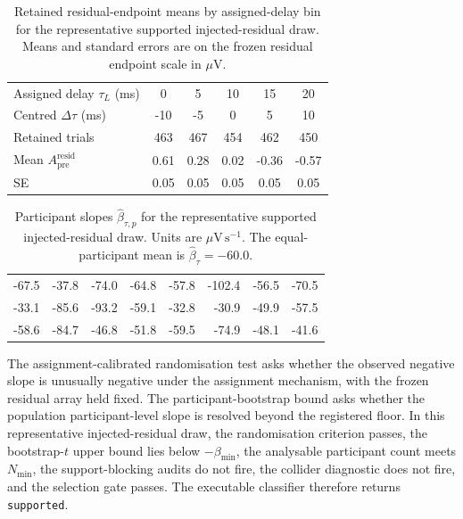 \begin{table}[t]
\centering
\caption{Retained residual-endpoint means by assigned-delay bin for the representative supported injected-residual draw. Means and standard errors are on the frozen residual endpoint scale in \(\mu\mathrm{V}\).}
\label{tab:si-worked-bins}
\footnotesize
\setlength{\tabcolsep}{4pt}
\begin{tabular}{lccccc}
\toprule
Assigned delay \(\tau_L\) (ms) & 0 & 5 & 10 & 15 & 20 \\
Centred \(\Delta\tau\) (ms) & -10 & -5 & 0 & 5 & 10 \\
\midrule
Retained trials & 463 & 467 & 454 & 462 & 450 \\
Mean \(A^{\mathrm{resid}}_{\mathrm{pre}}\) & 0.61 & 0.28 & 0.02 & -0.36 & -0.57 \\
SE & 0.05 & 0.05 & 0.05 & 0.05 & 0.05 \\
\bottomrule
\end{tabular}
\end{table}

\begin{table}[t]
\centering
\caption{Participant slopes \(\widehat\beta_{\tau,p}\) for the representative supported injected-residual draw. Units are \(\mu\mathrm{V\,s^{-1}}\). The equal-participant mean is \(\widehat\beta_\tau=-60.0\).}
\label{tab:si-worked-slopes}
\footnotesize
\begin{tabular}{rrrrrrrr}
\toprule
-67.5 & -37.8 & -74.0 & -64.8 & -57.8 & -102.4 & -56.5 & -70.5 \\
-33.1 & -85.6 & -93.2 & -59.1 & -32.8 & -30.9 & -49.9 & -57.5 \\
-58.6 & -84.7 & -46.8 & -51.8 & -59.5 & -74.9 & -48.1 & -41.6 \\
\bottomrule
\end{tabular}
\end{table}

The assignment-calibrated randomisation test asks whether the observed negative slope is unusually negative under the assignment mechanism, with the frozen residual array held fixed. The participant-bootstrap bound asks whether the population participant-level slope is resolved beyond the registered floor. In this representative injected-residual draw, the randomisation criterion passes, the bootstrap-\(t\) upper bound lies below \(-\beta_{\min}\), the analysable participant count meets \(N_{\min}\), the support-blocking audits do not fire, the collider diagnostic does not fire, and the selection gate passes. The executable classifier therefore returns \texttt{supported}.

